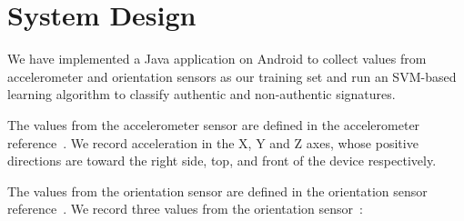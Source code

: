 \documentclass[12pt]{article}
\begin{document}
\section{System Design}

We have implemented a Java application on Android to collect values from accelerometer and orientation sensors as our training set and run an SVM-based learning algorithm to classify authentic and non-authentic signatures.

The values from the accelerometer sensor are defined in the accelerometer reference~\cite{}. We record acceleration in the X, Y and Z axes, whose positive directions are toward the right side, top, and front of the device respectively.

The values from the orientation sensor are defined in the orientation sensor reference~\cite{}.
We record three values from the orientation sensor~\cite{}:
\end{document}
